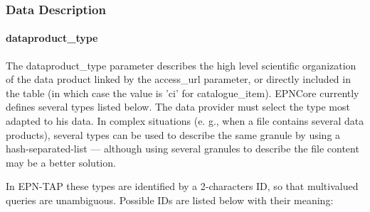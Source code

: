 \documentclass[11pt,a4paper]{ivoa}
\begin{document}
\subsubsection{Data Description}

\paragraph{dataproduct\_type}

The dataproduct\_type parameter describes the high level scientific organization of the data product linked by the access\_url parameter, or directly included in the table (in which case the value is 'ci' for catalogue\_item). EPNCore currently defines several types listed below. The data provider must select the type most adapted to his data. In complex situations (e. g., when a file contains several data products), several types can be used to describe the same granule by using a hash-separated-list — although using several granules to describe the file content may be a better solution.  

In EPN-TAP these types are identified by a 2-characters ID, so that multivalued queries are unambiguous. Possible IDs are listed below with their meaning:
\end{document}
